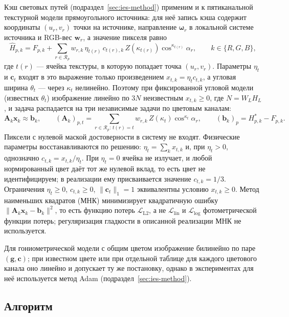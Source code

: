 Кэш световых путей (подраздел~\ref{sec:ies-method}) применим и к пятиканальной текстурной модели прямоугольного источника: для неё запись кэша содержит координаты $(u_r,v_r)$ точки на источнике, направление $\boldsymbol{\omega}_r$ в локальной системе источника и RGB-вес $\mathbf{w}_r$, а значение пикселя равно
\begin{equation}
\widehat{H}_{p,k}
=
F_{p,k}
+
\sum_{r\in\mathcal{R}_p}
w_{r,k}\,
\eta_{t(r)}\,c_{t(r),k}\,
Z(\kappa_{t(r)})
\cos^{\kappa_{t(r)}}\alpha_r,
\qquad k\in\{R,G,B\},
\end{equation}
где $t(r)$ --- ячейка текстуры, в которую попадает точка $(u_r,v_r)$. Параметры $\eta_t$ и $\mathbf{c}_t$ входят в это выражение только произведением $x_{t,k}=\eta_t c_{t,k}$, а угловая ширина $\theta_t$ --- через $\kappa_t$ нелинейно. Поэтому при фиксированной угловой модели (известных $\theta_t$) изображение линейно по $3N$ неизвестным $x_{t,k}\geq 0$, где $N=W_LH_L$, и задача распадается на три независимые задачи по цветовым каналам:
\begin{equation}
\mathbf{A}_k\mathbf{x}_k\approx\mathbf{b}_k,
\qquad
(\mathbf{A}_k)_{p,t}
=
\sum_{r\in\mathcal{R}_p:\,t(r)=t}
w_{r,k}\,Z(\kappa_t)\cos^{\kappa_t}\alpha_r,
\qquad
(\mathbf{b}_k)_p=H^\ast_{p,k}-F_{p,k}.
\end{equation}
Пиксели с нулевой маской достоверности в систему не входят. Физические параметры восстанавливаются по решению: $\eta_t=\sum_k x_{t,k}$ и, при $\eta_t>0$, однозначно $c_{t,k}=x_{t,k}/\eta_t$. При $\eta_t=0$ ячейка не излучает, и любой нормированный цвет даёт тот же нулевой вклад, то есть цвет не идентифицируем; в реализации ему присваивается значение $c_{t,k}=1/3$. Ограничения $\eta_t\geq 0$, $c_{t,k}\geq 0$, $\|\mathbf{c}_t\|_1=1$ эквивалентны условию $x_{t,k}\geq 0$. Метод наименьших квадратов (МНК) минимизирует квадратичную ошибку $\|\mathbf{A}_k\mathbf{x}_k-\mathbf{b}_k\|^2$, то есть функцию потерь $\mathcal{L}_{\mathrm{L2}}$, а не $\mathcal{L}_{\mathrm{lin}}$ и $\mathcal{L}_{\log}$ фотометрической функции потерь; регуляризация гладкости в описанной реализации МНК не используется.

Для гониометрической модели с общим цветом изображение билинейно по паре $(\mathbf{g},\mathbf{c})$; при известном цвете или при отдельной таблице для каждого цветового канала оно линейно и допускает ту же постановку, однако в экспериментах для неё используется метод Adam (подраздел~\ref{sec:ies-method}).

\subsection{Алгоритм}

